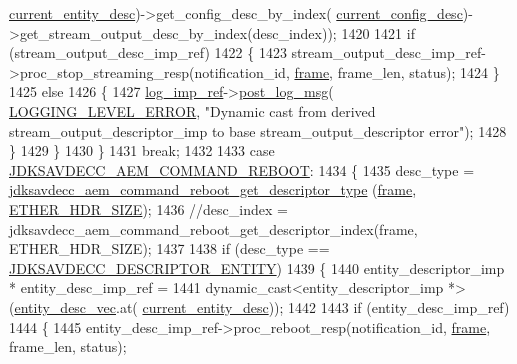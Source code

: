 \begin{DoxyCode}
{{{      \hyperlink{classavdecc__lib_1_1end__station__imp_afd78c89df26ba7641e1adb764c0e827d}{current\_entity\_desc})->get\_config\_desc\_by\_index(
      \hyperlink{classavdecc__lib_1_1end__station__imp_a60b1af40d35e8a86b0082c54ab6cb6a8}{current\_config\_desc})->get\_stream\_output\_desc\_by\_index(desc\_index));
1420 
1421             \textcolor{keywordflow}{if} (stream\_output\_desc\_imp\_ref)
1422             \{
1423                 stream\_output\_desc\_imp\_ref->proc\_stop\_streaming\_resp(notification\_id, 
      \hyperlink{gst__avb__playbin_8c_ac8e710e0b5e994c0545d75d69868c6f0}{frame}, frame\_len, status);
1424             \}
1425             \textcolor{keywordflow}{else}
1426             \{
1427                 \hyperlink{namespaceavdecc__lib_acbe3e2a96ae6524943ca532c87a28529}{log\_imp\_ref}->\hyperlink{classavdecc__lib_1_1log_a68139a6297697e4ccebf36ccfd02e44a}{post\_log\_msg}(
      \hyperlink{namespaceavdecc__lib_a501055c431e6872ef46f252ad13f85cdaf2c4481208273451a6f5c7bb9770ec8a}{LOGGING\_LEVEL\_ERROR}, \textcolor{stringliteral}{"Dynamic cast from derived stream\_output\_descriptor\_imp to base
       stream\_output\_descriptor error"});
1428             \}
1429         \}
1430     \}
1431     \textcolor{keywordflow}{break};
1432 
1433     \textcolor{keywordflow}{case} \hyperlink{group__command_ga859da6235182638521da6af153bc6d3c}{JDKSAVDECC\_AEM\_COMMAND\_REBOOT}:
1434     \{
1435         desc\_type = \hyperlink{group__command__reboot_ga93d390a9dc9aac8dcacf02e949615f6c}{jdksavdecc\_aem\_command\_reboot\_get\_descriptor\_type}
      (\hyperlink{gst__avb__playbin_8c_ac8e710e0b5e994c0545d75d69868c6f0}{frame}, \hyperlink{namespaceavdecc__lib_a6c827b1a0d973e18119c5e3da518e65ca9512ad9b34302ba7048d88197e0a2dc0}{ETHER\_HDR\_SIZE});
1436         \textcolor{comment}{//desc\_index = jdksavdecc\_aem\_command\_reboot\_get\_descriptor\_index(frame, ETHER\_HDR\_SIZE);}
1437 
1438         \textcolor{keywordflow}{if} (desc\_type == \hyperlink{group__descriptor_gaf06b7a0bf808dc8e3104511947d694c4}{JDKSAVDECC\_DESCRIPTOR\_ENTITY})
1439         \{
1440             entity\_descriptor\_imp * entity\_desc\_imp\_ref =
1441                 \textcolor{keyword}{dynamic\_cast<}entity\_descriptor\_imp *\textcolor{keyword}{>}(\hyperlink{classavdecc__lib_1_1end__station__imp_a72edab41bc56e3c1757944a7df188a3d}{entity\_desc\_vec}.at(
      \hyperlink{classavdecc__lib_1_1end__station__imp_afd78c89df26ba7641e1adb764c0e827d}{current\_entity\_desc}));
1442 
1443             \textcolor{keywordflow}{if} (entity\_desc\_imp\_ref)
1444             \{
1445                 entity\_desc\_imp\_ref->proc\_reboot\_resp(notification\_id, \hyperlink{gst__avb__playbin_8c_ac8e710e0b5e994c0545d75d69868c6f0}{frame}, frame\_len, status);
}}}
\end{DoxyCode}
